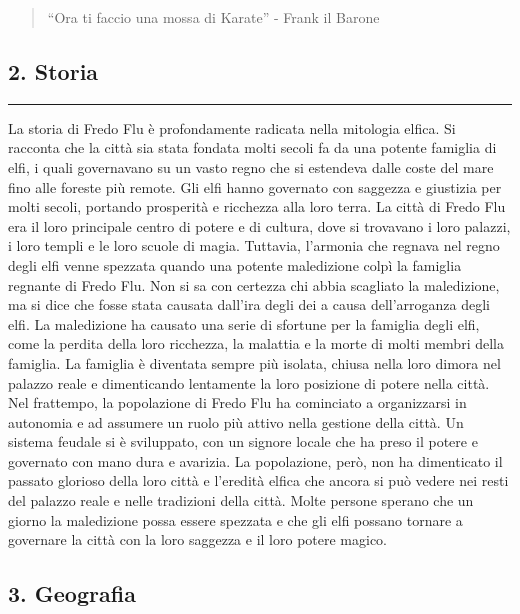 \begin{quote}
``Ora ti faccio una mossa di Karate'' - Frank il Barone
\end{quote}

\subsection{2. Storia}\label{storia}

\begin{center}\rule{0.5\linewidth}{0.5pt}\end{center}

La storia di Fredo Flu è profondamente radicata nella mitologia elfica.
Si racconta che la città sia stata fondata molti secoli fa da una
potente famiglia di elfi, i quali governavano su un vasto regno che si
estendeva dalle coste del mare fino alle foreste più remote. Gli elfi
hanno governato con saggezza e giustizia per molti secoli, portando
prosperità e ricchezza alla loro terra. La città di Fredo Flu era il
loro principale centro di potere e di cultura, dove si trovavano i loro
palazzi, i loro templi e le loro scuole di magia. Tuttavia, l'armonia
che regnava nel regno degli elfi venne spezzata quando una potente
maledizione colpì la famiglia regnante di Fredo Flu. Non si sa con
certezza chi abbia scagliato la maledizione, ma si dice che fosse stata
causata dall'ira degli dei a causa dell'arroganza degli elfi. La
maledizione ha causato una serie di sfortune per la famiglia degli elfi,
come la perdita della loro ricchezza, la malattia e la morte di molti
membri della famiglia. La famiglia è diventata sempre più isolata,
chiusa nella loro dimora nel palazzo reale e dimenticando lentamente la
loro posizione di potere nella città. Nel frattempo, la popolazione di
Fredo Flu ha cominciato a organizzarsi in autonomia e ad assumere un
ruolo più attivo nella gestione della città. Un sistema feudale si è
sviluppato, con un signore locale che ha preso il potere e governato con
mano dura e avarizia. La popolazione, però, non ha dimenticato il
passato glorioso della loro città e l'eredità elfica che ancora si può
vedere nei resti del palazzo reale e nelle tradizioni della città. Molte
persone sperano che un giorno la maledizione possa essere spezzata e che
gli elfi possano tornare a governare la città con la loro saggezza e il
loro potere magico.

\subsection{3. Geografia}\label{geografia}

